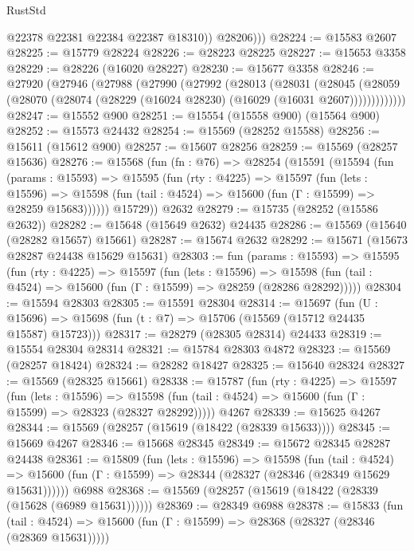 \begin{lexlean}{RustStd}
\begin{coremodule}
              @22378
              @22381
              @22384
              @22387
              @18310))
          @28206)))
@28224 := @15583 @2607
@28225 := @15779 @28224
@28226 := @28223 @28225
@28227 := @15653 @3358
@28229 := @28226 (@16020 @28227)
@28230 := @15677 @3358
@28246 := @27920
    (@27946
      (@27988
        (@27990
          (@27992
            (@28013
              (@28031
                (@28045
                  (@28059 (@28070 (@28074 (@28229 (@16024 @28230) (@16029 (@16031 @2607)))))))))))))
@28247 := @15552 @900
@28251 := @15554 (@15558 @900) (@15564 @900)
@28252 := @15573 @24432
@28254 := @15569 (@28252 @15588)
@28256 := @15611 (@15612 @900)
@28257 := @15607 @28256
@28259 := @15569 (@28257 @15636)
@28276 := @15568
    (fun (fn : @76) =>
    @28254
      (@15591
        (@15594
          (fun (params : @15593) =>
          @15595
            (fun (rty : @4225) =>
            @15597
              (fun (lets : @15596) =>
              @15598 (fun (tail : @4524) => @15600 (fun (Γ : @15599) => @28259 @15683))))))
        @15729))
    @2632
@28279 := @15735 (@28252 (@15586 @2632))
@28282 := @15648 (@15649 @2632) @24435
@28286 := @15569 (@15640 (@28282 @15657) @15661)
@28287 := @15674 @2632
@28292 := @15671 (@15673 @28287 @24438 @15629 @15631)
@28303 := fun (params : @15593) =>
  @15595
    (fun (rty : @4225) =>
    @15597
      (fun (lets : @15596) =>
      @15598 (fun (tail : @4524) => @15600 (fun (Γ : @15599) => @28259 (@28286 @28292)))))
@28304 := @15594 @28303
@28305 := @15591 @28304
@28314 := @15697
    (fun (U : @15696) => @15698 (fun (t : @7) => @15706 (@15569 (@15712 @24435 @15587) @15723)))
@28317 := @28279 (@28305 @28314) @24433
@28319 := @15554 @28304 @28314
@28321 := @15784 @28303 @4872
@28323 := @15569 (@28257 @18424)
@28324 := @28282 @18427
@28325 := @15640 @28324
@28327 := @15569 (@28325 @15661)
@28338 := @15787
    (fun (rty : @4225) =>
    @15597
      (fun (lets : @15596) =>
      @15598 (fun (tail : @4524) => @15600 (fun (Γ : @15599) => @28323 (@28327 @28292)))))
    @4267
@28339 := @15625 @4267
@28344 := @15569 (@28257 (@15619 (@18422 (@28339 @15633))))
@28345 := @15669 @4267
@28346 := @15668 @28345
@28349 := @15672 @28345 @28287 @24438
@28361 := @15809
    (fun (lets : @15596) =>
    @15598
      (fun (tail : @4524) =>
      @15600 (fun (Γ : @15599) => @28344 (@28327 (@28346 (@28349 @15629 @15631))))))
    @6988
@28368 := @15569 (@28257 (@15619 (@18422 (@28339 (@15628 (@6989 @15631))))))
@28369 := @28349 @6988
@28378 := @15833
    (fun (tail : @4524) => @15600 (fun (Γ : @15599) => @28368 (@28327 (@28346 (@28369 @15631)))))

\end{coremodule}
\end{lexlean}

